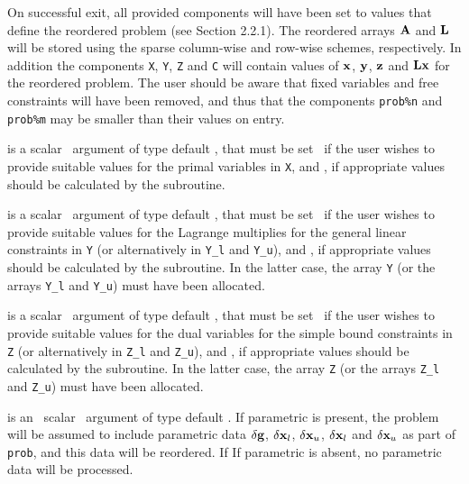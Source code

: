 \documentclass{galahad}
\begin{document}
\begin{description}

On successful exit, all provided components will have been set to values 
that define the reordered problem (see Section 2.2.1). The reordered 
arrays ${\mathbf{A}}$ and ${\mathbf{L}}$ will be stored using the sparse column-wise and 
row-wise schemes, respectively. In addition the components
{\tt X}, {\tt Y}, {\tt Z} and {\tt C} will contain values of 
${\mathbf{x}}$, ${\mathbf{y}}$, ${\mathbf{z}}$ and ${\mathbf{L}} {\mathbf{x}}$ for the reordered problem. 
The user should be aware that fixed variables and free constraints will have 
been removed, and thus that the components {\tt prob\%n} and {\tt prob\%m} 
may be smaller than their values on entry. 

 is a scalar \intentin\ argument of type default \logical, that 
must be set \false\ if the user wishes to provide suitable values for the 
primal variables in {\tt X}, and \true, if appropriate values should be 
calculated by the subroutine. 
 
 is a scalar \intentin\ argument of type default \logical, that 
must be set \false\ if the user wishes to provide suitable values for the 
Lagrange multiplies for the general linear constraints in {\tt Y}
(or alternatively in {\tt Y\_l} and {\tt Y\_u}), 
and \true, if appropriate values should be calculated by the subroutine. 
In the latter case, the array {\tt Y} (or the arrays {\tt Y\_l} and {\tt Y\_u})
must have been allocated.
 
 is a scalar \intentin\ argument of type default \logical, that 
must be set \false\ if the user wishes to provide suitable values for the 
dual variables for the simple bound constraints in {\tt Z}
(or alternatively in {\tt Z\_l} and {\tt Z\_u}), and \true, 
if appropriate values should be calculated by the subroutine. 
In the latter case, the array {\tt Z} (or the arrays {\tt Z\_l} and {\tt Z\_u})
must have been allocated.

is an \optional\ scalar \intentin\ argument of type default \logical. 
If {parametric} is present, the problem will be assumed to include
parametric data $\delta {\mathbf{g}}$, $\delta {\mathbf{x}}_l$, $\delta {\mathbf{x}}_u$, 
$\delta {\mathbf{x}}_l$ and $\delta {\mathbf{x}}_u$ as part of {\tt prob},
and this data will be reordered. If 
If {parametric} is absent, no parametric data will be processed.
 
\end{description}
\end{document}
